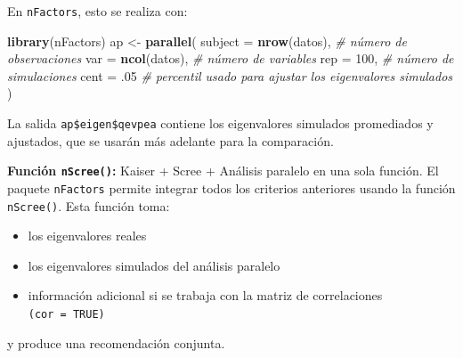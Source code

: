 \documentclass[
]{book}
\newenvironment{Shaded}{\begin{snugshade}}{\end{snugshade}}
\newcommand{\AttributeTok}[1]{\textcolor[rgb]{0.13,0.29,0.53}{#1}}
\newcommand{\CommentTok}[1]{\textcolor[rgb]{0.56,0.35,0.01}{\textit{#1}}}
\newcommand{\ConstantTok}[1]{\textcolor[rgb]{0.56,0.35,0.01}{#1}}
\newcommand{\DecValTok}[1]{\textcolor[rgb]{0.00,0.00,0.81}{#1}}
\newcommand{\FunctionTok}[1]{\textcolor[rgb]{0.13,0.29,0.53}{\textbf{#1}}}
\newcommand{\NormalTok}[1]{#1}
\newcommand{\OtherTok}[1]{\textcolor[rgb]{0.56,0.35,0.01}{#1}}
\newcommand{\SpecialCharTok}[1]{\textcolor[rgb]{0.81,0.36,0.00}{\textbf{#1}}}
\begin{document}
En \texttt{nFactors}, esto se realiza con:

\begin{Shaded}
\begin{Highlighting}[]
\FunctionTok{library}\NormalTok{(nFactors)}
\NormalTok{ap }\OtherTok{\textless{}{-}} \FunctionTok{parallel}\NormalTok{(}
  \AttributeTok{subject =} \FunctionTok{nrow}\NormalTok{(datos),   }\CommentTok{\# número de observaciones}
  \AttributeTok{var     =} \FunctionTok{ncol}\NormalTok{(datos),   }\CommentTok{\# número de variables}
  \AttributeTok{rep     =} \DecValTok{100}\NormalTok{,                 }\CommentTok{\# número de simulaciones}
  \AttributeTok{cent    =}\NormalTok{ .}\DecValTok{05}                  \CommentTok{\# percentil usado para ajustar los eigenvalores simulados}
\NormalTok{)}
\end{Highlighting}
\end{Shaded}

La salida \texttt{ap\$eigen\$qevpea} contiene los eigenvalores simulados promediados y ajustados, que se usarán más adelante para la comparación.

\textbf{Función \texttt{nScree()}:} Kaiser + Scree + Análisis paralelo en una sola función. El paquete \texttt{nFactors} permite integrar todos los criterios anteriores usando la función \texttt{nScree()}. Esta función toma:

\begin{itemize}
\item
  los eigenvalores reales
\item
  los eigenvalores simulados del análisis paralelo
\item
  información adicional si se trabaja con la matriz de correlaciones \texttt{(cor\ =\ TRUE)}
\end{itemize}

y produce una recomendación conjunta.

\begin{Shaded}
\end{Shaded}
\end{document}
